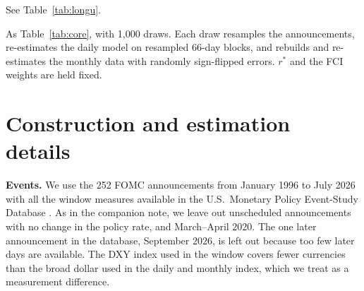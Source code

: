 \documentclass[11pt]{article}
\newcommand{\rs}{r^{*}}
\begin{document}
\begin{table}[H]\centering\small
\caption{Price-level response with the monthly equations estimated on longer samples}\label{tab:longp}
{\setlength{\tabcolsep}{4pt}\resizebox{\ifdim\width>\linewidth\linewidth\else\width\fi}{!}{}}
\par\smallskip\begin{minipage}{0.95\textwidth}\footnotesize See Table~\ref{tab:longu}.\end{minipage}
\end{table}
\begin{table}[H]\centering\small
\caption{Main steps with a fuller measure of uncertainty}\label{tab:boot}
{\setlength{\tabcolsep}{4pt}\resizebox{\ifdim\width>\linewidth\linewidth\else\width\fi}{!}{}}
\par\smallskip\begin{minipage}{0.95\textwidth}\footnotesize As Table~\ref{tab:core}, with 1,000 draws. Each draw resamples the announcements, re-estimates the daily model on resampled 66-day blocks, and rebuilds and re-estimates the monthly data with randomly sign-flipped errors. $\rs$ and the FCI weights are held fixed.\end{minipage}
\end{table}

\section{Construction and estimation details}\label{app:details}
\textbf{Events.} We use the 252 FOMC announcements from January 1996 to July 2026 with all the window measures available in the U.S.\ Monetary Policy Event-Study Database \citep{acosta2025}. As in the companion note, we leave out unscheduled announcements with no change in the policy rate, and March--April 2020. The one later announcement in the database, September 2026, is left out because too few later days are available. The DXY index used in the window covers fewer currencies than the broad dollar used in the daily and monthly index, which we treat as a measurement difference.
\end{document}

